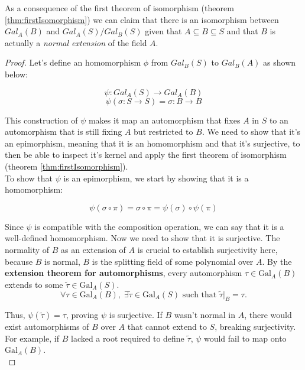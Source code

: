\begin{theorem}
\label{thm:GaloisIsomorphism}
    As a consequence of the first theorem of isomorphism (theorem \ref{thm:firstIsomorphism}) 
    we can claim that there is an isomorphism between $Gal_{A}(B)$ and $Gal_{A}(S)/Gal_{B}(S)$ 
    given that $A \subseteq B \subseteq S$ and that $B$ is actually a \emph{normal extension} 
    of the field $A$.
\end{theorem}
\begin{proof}
    Let's define an homomorphism $\phi$ from $Gal_{B}(S)$ to $Gal_{B}(A)$ as shown below:

    $$ \psi : Gal_{A}(S) \rightarrow Gal_{A}(B) $$
    $$ \psi(\sigma : S \rightarrow S) = \sigma : B \rightarrow B $$ 
    \vspace{0.1em}

    This construction of $\psi$ makes it map an automorphism that fixes $A$ in $S$ to 
    an automorphism that is still fixing $A$ but restricted to $B$. We need to show that it's 
    an epimorphism, meaning that it is an homomorphism and that it's surjective, 
    to then be able to inspect it's kernel and apply the first theorem of isomorphism 
    (theorem \ref{thm:firstIsomorphism}). \\

    To show that $\psi$ is an epimorphism, we start by showing that it is a homomorphism:

    \vspace{0.2em}
    $$ \psi(\sigma \circ \pi) = \sigma \circ \pi = \psi(\sigma) \circ \psi(\pi) $$
    \vspace{0.2em}

    Since $\psi$ is compatible with the composition operation, we can say that it is a well-defined 
    homomorphism. Now we need to show that it is surjective. The normality of $B$ as an extension
    of $A$ is crucial to establish surjectivity here, because $B$ is normal, $B$ is the splitting 
    field of some polynomial over $A$. By the \textbf{extension theorem for automorphisms}, every 
    automorphism $\tau \in \text{Gal}_A(B)$ extends to some $\tilde{\tau} \in 
    \text{Gal}_A(S)$. \\  

    $$
        \forall \tau \in \text{Gal}_A(B), \; \exists \tilde{\tau} \in \text{Gal}_A(S) 
        \text{ such that } \tilde{\tau}|_B = \tau.
    $$
    \vspace{0.2em}
    
    Thus, $\psi(\tilde{\tau}) = \tau$, proving $\psi$ is surjective. If $B$ wasn't normal in $A$, 
    there would exist automorphisms of $B$ over $A$ that cannot extend to $S$, 
    breaking surjectivity. For example, if $B$ lacked a root required to 
    define $\tilde{\tau}$, 
    $\psi$ would fail to map onto $\text{Gal}_A(B)$. \\
    

\end{proof}
